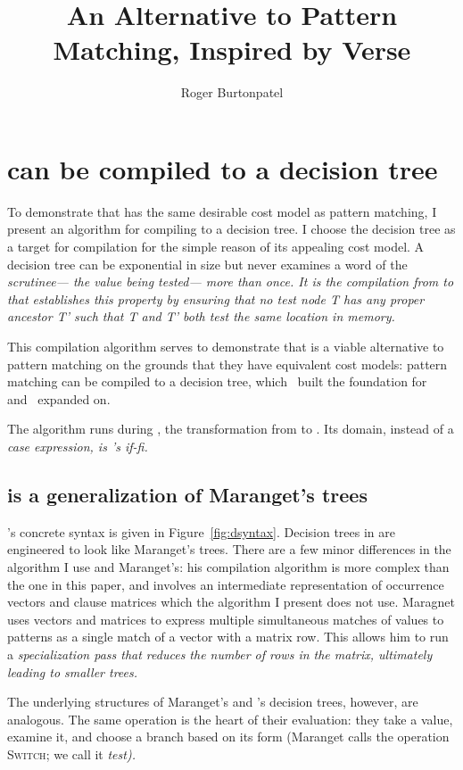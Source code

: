 \documentclass[manuscript,screen,review, 12pt, nonacm]{acmart}
\title{An Alternative to Pattern Matching, Inspired by Verse}
\author{Roger Burtonpatel}
\affiliation{%
\institution{Tufts University}
\streetaddress{419 Boston Ave}
  \city{Medford}
  \state{Massachusetts}
  \country{USA}
  \postcode{02155}
  }
\begin{document}
  

\section{\VMinus can be compiled to a decision tree}
\label{vminustod}
    To demonstrate that \VMinus has the same desirable cost model as pattern
    matching, I present an algorithm for compiling \VMinus to a decision tree. I
    choose the decision tree as a target for compilation for the simple reason
    of its appealing cost model. A decision tree can be exponential in size but
    never examines a word of the \it{scrutinee}--- the value being tested---
    more than once. It is the compilation from \VMinus to \D that establishes
    this property by ensuring that no \it{test} node \it{T} has any proper
    ancestor \it{T'} such that \it{T} and \it{T'} both test the same location in
    memory.   

    This compilation algorithm serves to demonstrate that \VMinus is a viable
    alternative to pattern matching on the grounds that they have equivalent
    cost models: pattern matching can be compiled to a decision tree,
    which~\citet{macqueen1985tree} built the foundation for and~\citet{maranget}
    expanded on. 

    The algorithm runs during \DTran, the transformation from \VMinus to \D. Its
    domain, instead of a \it{case} expression, is \VMinus's \it{if-fi}. 
       
    \subsection{\D is a generalization of Maranget's trees} 

  \D's concrete syntax is given in Figure~\ref{fig:dsyntax}. Decision trees in \D
    are engineered to look like Maranget's trees. There are a few minor
    differences in the algorithm I use and Maranget's: his compilation algorithm
    is more complex than the one in this paper, and involves an intermediate
    representation of occurrence vectors and clause matrices which the algorithm
    I present does not use. Maragnet uses vectors and matrices to express
    multiple simultaneous matches of values to patterns as a single match of a
    vector with a matrix row. This allows him to run a \it{specialization} pass
    that reduces the number of rows in the matrix, ultimately leading to smaller
    trees.
    
        
    The underlying structures of Maranget's and \D's decision trees, however,
    are analogous. The same operation is the heart of their evaluation: they
    take a value, examine it, and choose a branch based on its form (Maranget
    calls the operation \textsc{Switch}; we call it \it{test}). 
\end{document}

